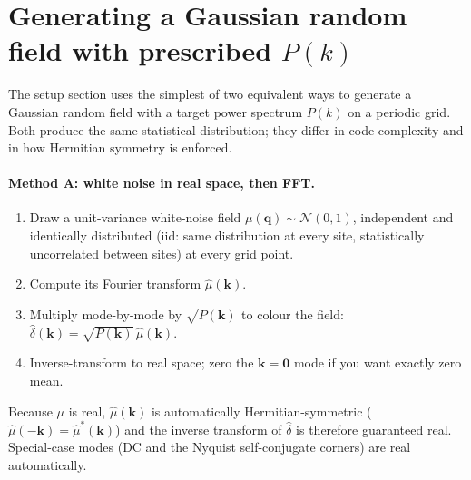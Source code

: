 \documentclass[12pt]{article}
\begin{document}
\section{Generating a Gaussian random field with prescribed $P(k)$}\label{app:grfgen}

The setup section uses the simplest of two equivalent ways to generate
a Gaussian random field with a target power spectrum $P(k)$ on a
periodic grid. Both produce the same statistical distribution; they
differ in code complexity and in how Hermitian symmetry is enforced.

\paragraph{Method A: white noise in real space, then FFT.}
\begin{enumerate}
\item Draw a unit-variance white-noise field
      $\mu(\mathbf q)\sim\mathcal N(0,1)$, independent and identically
      distributed (iid: same distribution at every site, statistically
      uncorrelated between sites) at every grid point.
\item Compute its Fourier transform $\hat\mu(\mathbf k)$.
\item Multiply mode-by-mode by $\sqrt{P(\mathbf k)}$ to colour the field:
      $\hat\delta(\mathbf k) = \sqrt{P(\mathbf k)}\,\hat\mu(\mathbf k)$.
\item Inverse-transform to real space; zero the
      $\mathbf k=\mathbf 0$ mode if you want exactly zero mean.
\end{enumerate}
Because $\mu$ is real, $\hat\mu(\mathbf k)$ is automatically
Hermitian-symmetric ($\hat\mu(-\mathbf k)=\hat\mu^*(\mathbf k)$) and
the inverse transform of $\hat\delta$ is therefore guaranteed real.
Special-case modes (DC and the Nyquist self-conjugate corners) are
real automatically.
\end{document}
